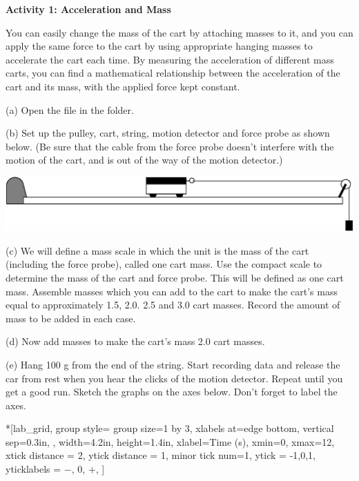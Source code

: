 \medskip
\textbf{Activity 1: Acceleration and Mass }

You can easily change the mass of the cart by attaching masses to it, and you
can apply the same force to the cart by using appropriate hanging masses to
accelerate the cart each time. By measuring the acceleration of different mass
carts, you can find a mathematical relationship between the acceleration of
the cart and its mass, with the applied force kept constant.

(a) Open the file   in the \filename{\coursefolder} folder.%
\medskip

(b) Set up the pulley, cart, string, motion detector and force probe as shown
below. (Be sure that the cable from the force probe doesn't interfere with the
motion of the cart, and is out of the way of the motion detector.)
\bigskip

\answerspace{0.5cm}
{\par\centering \includegraphics{force1/force1_fig4.eps} \par}
\answerspace{0.5cm}

(c) We will define a mass scale in which the unit is the mass of the cart (including the force probe), called one cart mass. Use the compact scale to determine the mass of the cart and force probe. This will be defined as one cart mass. Assemble masses which you can add to the cart to make the cart's mass equal to approximately 1.5, 2.0. 2.5 and 3.0 cart masses. Record the amount of mass to be added in each case.
\answerspace{1in}

(d) Now add masses to make the cart's mass 2.0 cart masses.

\pagebreak[3]
(e) Hang 100 g from the end of the string.
Start recording data and release the car from rest when you hear the clicks
of the motion detector. Repeat until you get a good run. Sketch the graphs on
the axes below. Don't forget to label the axes.

\begin{lab_groupplot}*{}[lab_grid,
	group style={
		group size=1 by 3,
		xlabels at=edge bottom,
		vertical sep=0.3in,
		},
	width=4.2in,  height=1.4in,
	xlabel=Time (s),
	xmin=0, xmax=12,
	xtick distance = 2, 
	ytick distance = 1, 
	minor tick num=1,
	ytick = {-1,0,1},
	yticklabels = {$-$, 0, $+$},
	]
\nextgroupplot[
	ymin=-1,ymax=1, 
	ylabel={Velocity (m/s)},
	]
\nextgroupplot[
	ymin=-1,ymax=1, 
	ylabel={Acceleration (m/s$^2$)},
	]
\nextgroupplot[
	ymin=-1,ymax=1, 
	ylabel={Force (N)},
	]
\end{lab_groupplot}

